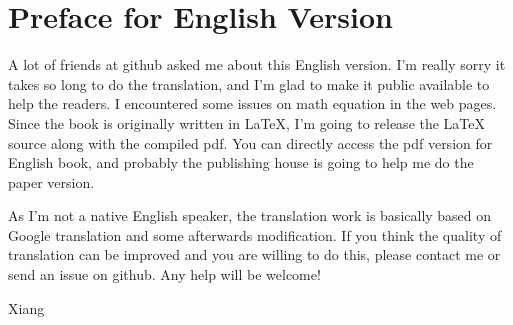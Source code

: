 \chapter*{Preface for English Version}
A lot of friends at github asked me about this English version. I'm really sorry it takes so long to do the translation, and I'm glad to make it public available to help the readers. I encountered some issues on math equation in the web pages. Since the book is originally written in LaTeX, I'm going to release the LaTeX source along with the compiled pdf. You can directly access the pdf version for English book, and probably the publishing house is going to help me do the paper version.

As I'm not a native English speaker, the translation work is basically based on Google translation and some afterwards modification. If you think the quality of translation can be improved and you are willing to do this, please contact me or send an issue on github. Any help will be welcome!

Xiang